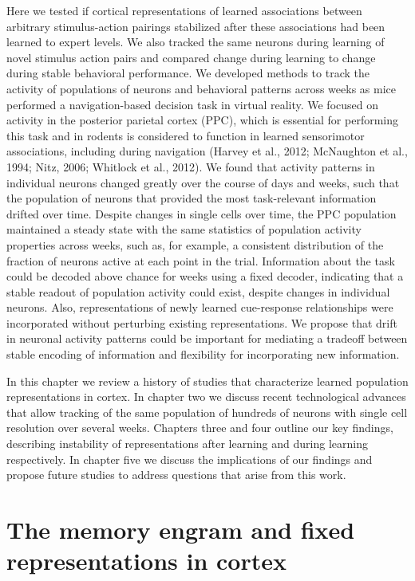 Here we tested if cortical representations of learned associations between arbitrary stimulus-action pairings stabilized after these associations had been learned to expert levels. We also tracked the same neurons during learning of novel stimulus action pairs and compared change during learning to change during stable behavioral performance. We developed methods to track the activity of populations of neurons and behavioral patterns across weeks as mice performed a navigation-based decision task in virtual reality. We focused on activity in the posterior parietal cortex (PPC), which is essential for performing this task and in rodents is considered to function in learned sensorimotor associations, including during navigation (Harvey et al., 2012; McNaughton et al., 1994; Nitz, 2006; Whitlock et al., 2012). We found that activity patterns in individual neurons changed greatly over the course of days and weeks, such that the population of neurons that provided the most task-relevant information drifted over time. Despite changes in single cells over time, the PPC population maintained a steady state with the same statistics of population activity properties across weeks, such as, for example, a consistent distribution of the fraction of neurons active at each point in the trial. Information about the task could be decoded above chance for weeks using a fixed decoder, indicating that a stable readout of population activity could exist, despite changes in individual neurons. Also, representations of newly learned cue-response relationships were incorporated without perturbing existing representations. We propose that drift in neuronal activity patterns could be important for mediating a tradeoff between stable encoding of information and flexibility for incorporating new information.

\bigskip

In this chapter we review a history of studies that characterize learned population representations in cortex. In chapter two we discuss recent technological advances that allow tracking of the same population of hundreds of neurons with single cell resolution over several weeks. Chapters three and four outline our key findings, describing instability of representations after learning and during learning respectively. In chapter five we discuss the implications of our findings and propose future studies to address questions that arise from this work.

\section{The memory engram and fixed representations in cortex} 

